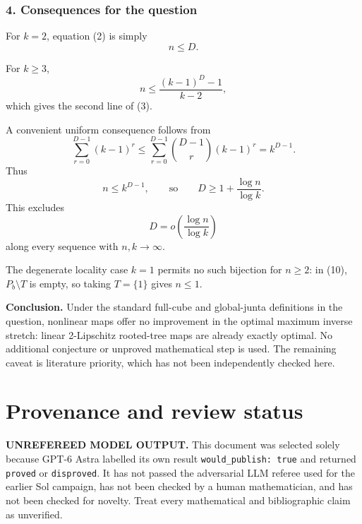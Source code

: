 \documentclass[
  11pt,
  a4paper,
]{article}
\begin{document}
\subsubsection{4. Consequences for the
question}\label{consequences-for-the-question}

For \(k=2\), equation (2) is simply \[
n\le D.
\]

For \(k\ge3\), \[
n\le\frac{(k-1)^D-1}{k-2},
\] which gives the second line of (3).

A convenient uniform consequence follows from \[
\sum_{r=0}^{D-1}(k-1)^r
\le
\sum_{r=0}^{D-1}\binom{D-1}{r}(k-1)^r
=k^{D-1}.
\] Thus \[
n\le k^{D-1},
\qquad\text{so}\qquad
D\ge1+\frac{\log n}{\log k}.
\] This excludes \[
D=o\!\left(\frac{\log n}{\log k}\right)
\] along every sequence with \(n,k\to\infty\).

The degenerate locality case \(k=1\) permits no such bijection for
\(n\ge2\): in (10), \(P_b\setminus T\) is empty, so taking \(T=\{1\}\)
gives \(n\le1\).

\textbf{Conclusion.} Under the standard full-cube and global-junta
definitions in the question, nonlinear maps offer no improvement in the
optimal maximum inverse stretch: linear 2-Lipschitz rooted-tree maps are
already exactly optimal. No additional conjecture or unproved
mathematical step is used. The remaining caveat is literature priority,
which has not been independently checked here.

\appendix

\section{Provenance and review
status}\label{provenance-and-review-status}

\begin{warning}

\textbf{UNREFEREED MODEL OUTPUT.} This document was selected solely
because GPT-6 Astra labelled its own result
\texttt{would\_publish:\ true} and returned \texttt{proved} or
\texttt{disproved}. It has not passed the adversarial LLM referee used
for the earlier Sol campaign, has not been checked by a human
mathematician, and has not been checked for novelty. Treat every
mathematical and bibliographic claim as unverified.

\end{warning}
\end{document}
